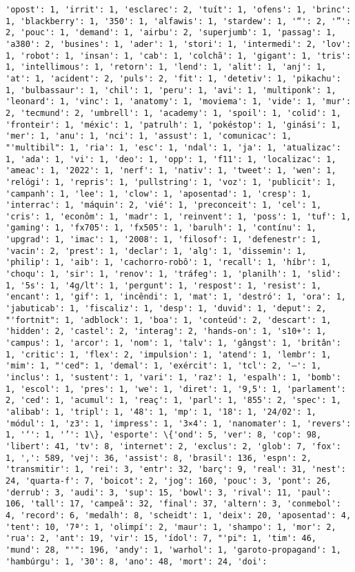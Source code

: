 \documentclass[11pt]{article}
\begin{document}
\begin{Verbatim}[commandchars=\\\{\}]
'opost': 1, 'irrit': 1, 'esclarec': 2, 'tuít': 1, 'ofens': 1, 'brinc': 1, 'blackberry': 1, '350': 1, 'alfawis': 1, 'stardew': 1, '“': 2, '”': 2, 'pouc': 1, 'demand': 1, 'airbu': 2, 'superjumb': 1, 'passag': 1, 'a380': 2, 'busines': 1, 'ader': 1, 'stori': 1, 'intermedi': 2, 'lov': 1, 'robot': 1, 'insan': 1, 'cab': 1, 'colchã': 1, 'gigant': 1, 'tris': 1, 'intellimous': 1, 'retorn': 1, 'lend': 1, 'alit': 1, 'anj': 1, 'at': 1, 'acident': 2, 'puls': 2, 'fit': 1, 'detetiv': 1, 'pikachu': 1, 'bulbassaur': 1, 'chil': 1, 'peru': 1, 'avi': 1, 'multiponk': 1, 'leonard': 1, 'vinc': 1, 'anatomy': 1, 'moviema': 1, 'vide': 1, 'mur': 2, 'tecmund': 2, 'umbrell': 1, 'academy': 1, 'spoil': 1, 'colid': 1, 'fronteir': 1, 'méxic': 1, 'patrulh': 1, 'pokéstop': 1, 'ginási': 1, 'mer': 1, 'anu': 1, 'nci': 1, 'assust': 1, 'comunicac': 1, "'multibil": 1, 'ria': 1, 'esc': 1, 'ndal': 1, 'ja': 1, 'atualizac': 1, 'ada': 1, 'vi': 1, 'deo': 1, 'opp': 1, 'f11': 1, 'localizac': 1, 'ameac': 1, '2022': 1, 'nerf': 1, 'nativ': 1, 'tweet': 1, 'wen': 1, 'relógi': 1, 'repris': 1, 'pullstring': 1, 'voz': 1, 'publicit': 1, 'campanh': 1, 'lee': 1, 'clow': 1, 'aposentad': 1, 'cresp': 1, 'interrac': 1, 'máquin': 2, 'vié': 1, 'preconceit': 1, 'cel': 1, 'cris': 1, 'econôm': 1, 'madr': 1, 'reinvent': 1, 'poss': 1, 'tuf': 1, 'gaming': 1, 'fx705': 1, 'fx505': 1, 'barulh': 1, 'contínu': 1, 'upgrad': 1, 'imac': 1, '2008': 1, 'filosof': 1, 'defenestr': 1, 'vacin': 2, 'prest': 1, 'declar': 1, 'alg': 1, 'dissemin': 1, 'philip': 1, 'aib': 1, 'cachorro-robô': 1, 'recall': 1, 'híbr': 1, 'choqu': 1, 'sir': 1, 'renov': 1, 'tráfeg': 1, 'planilh': 1, 'slid': 1, '5s': 1, '4g/lt': 1, 'pergunt': 1, 'respost': 1, 'resist': 1, 'encant': 1, 'gif': 1, 'incêndi': 1, 'mat': 1, 'destró': 1, 'ora': 1, 'jabuticab': 1, 'fiscaliz': 1, 'desp': 1, 'duvid': 1, 'deput': 2, "'fortnit": 1, 'adblock': 1, 'boa': 1, 'conteúd': 2, 'descart': 1, 'hidden': 2, 'castel': 2, 'interag': 2, 'hands-on': 1, 's10+': 1, 'campus': 1, 'arcor': 1, 'nom': 1, 'talv': 1, 'gângst': 1, 'britân': 1, 'critic': 1, 'flex': 2, 'impulsion': 1, 'atend': 1, 'lembr': 1, 'mim': 1, "'ced": 1, 'demal': 1, 'exércit': 1, 'tcl': 2, '—': 1, 'inclus': 1, 'sustent': 1, 'vari': 1, 'raz': 1, 'espalh': 1, 'bomb': 1, 'escol': 1, 'pres': 1, 'we': 1, 'diret': 1, '9,5': 1, 'parlament': 2, 'ced': 1, 'acumul': 1, 'reaç': 1, 'parl': 1, '855': 2, 'spec': 1, 'alibab': 1, 'tripl': 1, '48': 1, 'mp': 1, '18': 1, '24/02': 1, 'módul': 1, 'z3': 1, 'impress': 1, '3×4': 1, 'nanomater': 1, 'revers': 1, '‘': 1, '’': 1\}, 'esporte': \{'ond': 5, 'ver': 8, 'cop': 98, 'libert': 41, 'tv': 8, 'internet': 2, 'exclus': 2, 'glob': 7, 'fox': 1, ',': 589, 'vej': 36, 'assist': 8, 'brasil': 136, 'espn': 2, 'transmitir': 1, 'rei': 3, 'entr': 32, 'barç': 9, 'real': 31, 'nest': 24, 'quarta-f': 7, 'boicot': 2, 'jog': 160, 'pouc': 3, 'pont': 26, 'derrub': 3, 'audi': 3, 'sup': 15, 'bowl': 3, 'rival': 11, 'paul': 106, 'tall': 17, 'campeã': 32, 'final': 37, 'altern': 3, 'conmebol': 4, 'record': 6, 'medalh': 8, 'scheidt': 1, 'deix': 20, 'aposentad': 4, 'tent': 10, '7ª': 1, 'olimpí': 2, 'maur': 1, 'shampo': 1, 'mor': 2, 'rua': 2, 'ant': 19, 'vir': 15, 'ídol': 7, "'pi": 1, 'tim': 46, 'mund': 28, "'": 196, 'andy': 1, 'warhol': 1, 'garoto-propagand': 1, 'hambúrgu': 1, '30': 8, 'ano': 48, 'mort': 24, 'doi': 
\end{Verbatim}
\end{document}
